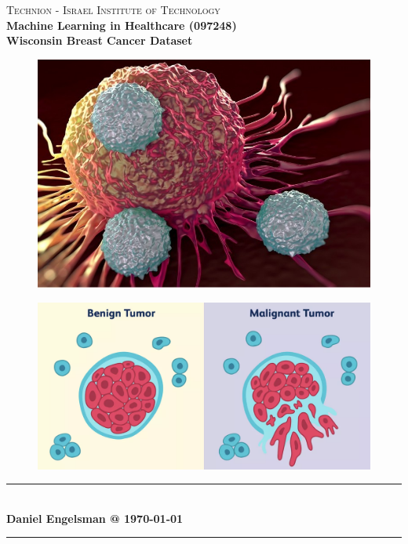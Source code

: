 \documentclass[12pt]{article}
\numberwithin{equation}{section}
\begin{document}
\begin{titlepage}
\newcommand{\HRule}{\rule{\linewidth}{0.5mm}}
\center
\textsc{\LARGE Technion - Israel Institute of Technology}\\[0.6cm]
{\large \textbf{Machine Learning in Healthcare (097248)}}\\[0.6cm]
{\large \textbf{Wisconsin Breast Cancer Dataset}}\\[1.25cm]

\begin{figure}[H]
\centering
\includegraphics[scale=0.451]{Intro_2.png}
\end{figure} 
\begin{figure}[H]
\centering
\includegraphics[scale=0.2375]{Intro_3.png}
\end{figure} 
\HRule \\[0.2cm]
\textbf{Daniel Engelsman @ {\today}}\\[0.1cm]
\HRule \\
\end{titlepage}
\end{document}
